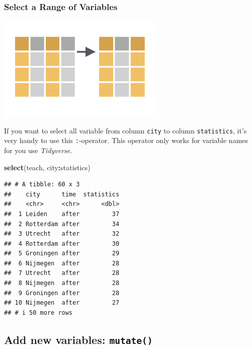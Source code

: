 \documentclass[
]{scrartcl}
\newenvironment{Shaded}{\begin{snugshade}}{\end{snugshade}}
\newcommand{\KeywordTok}[1]{\textcolor[rgb]{0.13,0.29,0.53}{\textbf{#1}}}
\newcommand{\NormalTok}[1]{#1}
\newcommand{\OperatorTok}[1]{\textcolor[rgb]{0.81,0.36,0.00}{\textbf{#1}}}
\begin{document}
\hypertarget{select-a-range-of-variables}{%
\subsubsection{Select a Range of Variables}\label{select-a-range-of-variables}}

\begin{center}\includegraphics[width=300px]{images/dplyr-select-range} \end{center}

If you want to select all variable from column \texttt{city} to column \texttt{statistics}, it's very handy to use this \texttt{:}-operator. This operator only works for variable names for you use \emph{Tidyverse}.

\begin{Shaded}
\begin{Highlighting}[]
\KeywordTok{select}\NormalTok{(teach, city}\OperatorTok{:}\NormalTok{statistics)}
\end{Highlighting}
\end{Shaded}

\begin{verbatim}
## # A tibble: 60 x 3
##    city      time  statistics
##    <chr>     <chr>      <dbl>
##  1 Leiden    after         37
##  2 Rotterdam after         34
##  3 Utrecht   after         32
##  4 Rotterdam after         30
##  5 Groningen after         29
##  6 Nijmegen  after         28
##  7 Utrecht   after         28
##  8 Nijmegen  after         28
##  9 Groningen after         28
## 10 Nijmegen  after         27
## # i 50 more rows
\end{verbatim}

\hypertarget{add-new-variables-mutate}{%
\subsection{\texorpdfstring{Add new variables: \texttt{mutate()}}{Add new variables: mutate()}}\label{add-new-variables-mutate}}
\end{document}
